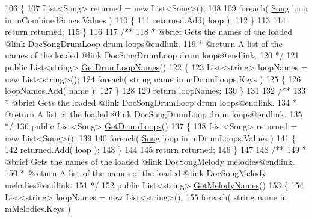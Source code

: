 \begin{DoxyCodeInclude}
106     \{
107         List<Song> returned = \textcolor{keyword}{new} List<Song>();
108 
109         \textcolor{keywordflow}{foreach}( \hyperlink{class_song}{Song} loop \textcolor{keywordflow}{in} mCombinedSongs.Values )
110         \{
111             returned.Add( loop );
112         \}
113 
114         \textcolor{keywordflow}{return} returned;
115     \}
116 \textcolor{comment}{}
117 \textcolor{comment}{    /**}
118 \textcolor{comment}{     * @brief Gets the names of the loaded @link DocSongDrumLoop drum loops@endlink.}
119 \textcolor{comment}{     * @return A list of the names of the loaded @link DocSongDrumLoop drum loops@endlink.}
120 \textcolor{comment}{    */}
121     \textcolor{keyword}{public} List<string> \hyperlink{group___s_m_pub_func_ga90e0aeb3117c5db6c667a23252bf45f6}{GetDrumLoopNames}()
122     \{
123         List<string> loopNames = \textcolor{keyword}{new} List<string>();
124         \textcolor{keywordflow}{foreach}( \textcolor{keywordtype}{string} name \textcolor{keywordflow}{in} mDrumLoops.Keys )
125         \{
126             loopNames.Add( name );
127         \}
128 
129         \textcolor{keywordflow}{return} loopNames;
130     \}
131 \textcolor{comment}{}
132 \textcolor{comment}{    /**}
133 \textcolor{comment}{     * @brief Gets the loaded @link DocSongDrumLoop drum loops@endlink.}
134 \textcolor{comment}{     * @return A list of the loaded @link DocSongDrumLoop drum loops@endlink.}
135 \textcolor{comment}{    */}
136     \textcolor{keyword}{public} List<Song> \hyperlink{group___s_m_pub_func_ga354a675f296f9a733ad6d76fea7429dd}{GetDrumLoops}()
137     \{
138         List<Song> returned = \textcolor{keyword}{new} List<Song>();
139 
140         \textcolor{keywordflow}{foreach}( \hyperlink{class_song}{Song} loop \textcolor{keywordflow}{in} mDrumLoops.Values )
141         \{
142             returned.Add( loop );
143         \}
144 
145         \textcolor{keywordflow}{return} returned;
146     \}
147 \textcolor{comment}{}
148 \textcolor{comment}{    /**}
149 \textcolor{comment}{     * @brief Gets the names of the loaded @link DocSongMelody melodies@endlink.}
150 \textcolor{comment}{     * @return A list of the names of the loaded @link DocSongMelody melodies@endlink.}
151 \textcolor{comment}{    */}
152     \textcolor{keyword}{public} List<string> \hyperlink{group___s_m_pub_func_ga59df8468ac771fc8eb1a5f2025e6c5a8}{GetMelodyNames}()
153     \{
154         List<string> loopNames = \textcolor{keyword}{new} List<string>();
155         \textcolor{keywordflow}{foreach}( \textcolor{keywordtype}{string} name \textcolor{keywordflow}{in} mMelodies.Keys )

\end{DoxyCodeInclude}

